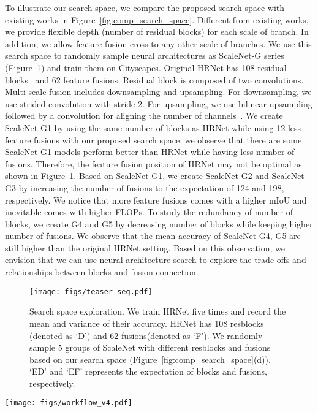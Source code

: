 \documentclass[final]{cvpr}
\newcommand{\workname}{ScaleNAS\xspace}
\newcommand{\netname}{ScaleNet\xspace}
\newcommand{\supernet}{SuperScaleNet\xspace}
\begin{document}
To illustrate our search space, we compare the proposed search space with existing works in Figure~\ref{fig:comp_search_space}.
Different from existing works, we provide flexible depth (number of residual blocks) for each scale of branch. In addition, we allow feature fusion cross to any other scale of branches.
We use this search space to randomly sample neural architectures as \netname-G series (Figure~\ref{fig:teaser_seg}) and train them on Cityscapes.
Original HRNet has 108 residual blocks~\cite{he2016deep} and 62 feature fusions. 
Residual block is composed of two  convolutions. Multi-scale fusion includes downsampling and upsampling. For downsampling, we use strided  convolution with stride 2. For upsampling, we use bilinear upsampling followed by a   convolution for aligning the number of channels~\cite{wang2020deep}.
We create ScaleNet-G1 by using the same number of blocks as HRNet while 
using 12 less feature fusions with our proposed search space, we observe that there are some ScaleNet-G1 models perform better than HRNet while having less number of fusions. Therefore, the feature fusion position of HRNet may not be optimal as shown in Figure~\ref{fig:teaser_seg}.
Based on \netname -G1, we create \netname -G2 and \netname -G3 by increasing the number of fusions to the expectation of 124 and 198, respectively. We notice that more feature fusions comes with a higher mIoU and inevitable comes with higher FLOPs. To study the redundancy of number of blocks, we create G4 and G5 by decreasing number of blocks while keeping higher number of fusions. We observe that the mean accuracy of \netname -G4, G5 are still higher than the original HRNet setting. Based on this observation, we envision that we can use neural architecture search to explore the trade-offs and relationships between blocks and fusion connection. 
\begin{figure}[h!]
    \centering
    \texttt{[image: figs/teaser\_seg.pdf]}
    \caption{Search space exploration. We train HRNet five times and record the mean and variance of their accuracy. HRNet has 108 resblocks (denoted as `D') and 62 fusions(denoted as `F'). We randomly sample 5 groups of \netname with different resblocks and fusions based on our search space (Figure~\ref{fig:comp_search_space}(d)). `ED' and `EF' represents the expectation of blocks and fusions, respectively. 
    }
    \label{fig:teaser_seg}
\end{figure} 


\begin{figure*}[ht]
    \centering
    \texttt{[image: figs/workflow\_v4.pdf]}
    \caption{Workflow of \workname.  \workname train a SuperScaleNet in the proposed search space and uses our proposed evolutionary method to explore elite architectures based on the trained SuperScaleNet.    (a) Before training starts, we initialize SuperScaleNet by the teacher model. (b) During each iteration, we sample ScaleNet from the SuperScaleNet. (c) We use the task loss from true labels and the knowledge distillation (KD) loss from soft labels given by teacher to update \supernet.}
    \label{fig:workflow}
\end{figure*}
\end{document}
